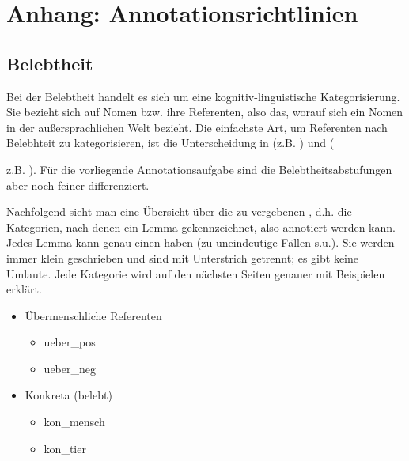 \chapter{Anhang: Annotationsrichtlinien}
\section{Belebtheit} \label{sec:richtlinien-belebtheit}


Bei der Belebtheit handelt es sich um eine kognitiv-linguistische Kategorisierung. Sie bezieht sich auf Nomen bzw. ihre Referenten, also das, worauf sich ein Nomen in der außersprachlichen Welt bezieht. Die einfachste Art, um Referenten nach Belebhteit zu kategorisieren, ist die Unterscheidung in  (z.B. ) und  ({z.B. ). Für die vorliegende Annotationsaufgabe sind die Belebtheitsabstufungen aber noch feiner differenziert. 

Nachfolgend sieht man eine Übersicht über die zu vergebenen , d.h. die Kategorien, nach denen ein Lemma gekennzeichnet, also annotiert werden kann. Jedes Lemma kann genau einen  haben (zu uneindeutige Fällen s.u.). Sie werden immer klein geschrieben und sind mit Unterstrich getrennt; es gibt keine Umlaute. Jede Kategorie wird auf den nächsten Seiten genauer mit Beispielen erklärt.

\vspace{-3ex}
\noindent\parbox[t]{2.4in}{\raggedright%
\begin{itemize}
\setlength{\itemsep}{0pt}
\item Übermenschliche Referenten
  \begin{itemize}
    \setlength{\itemsep}{-5pt}
  \item ueber\_pos
  \item ueber\_neg
  \end{itemize}
\end{itemize}
}%
\hfill%
\parbox[t]{2.4in}{\raggedright%
\begin{itemize}
\item Konkreta (belebt)
  \begin{itemize}
    \setlength{\itemsep}{-5pt}
  \item kon\_mensch
  \item kon\_tier
  \end{itemize}
\end{itemize}
}

}
